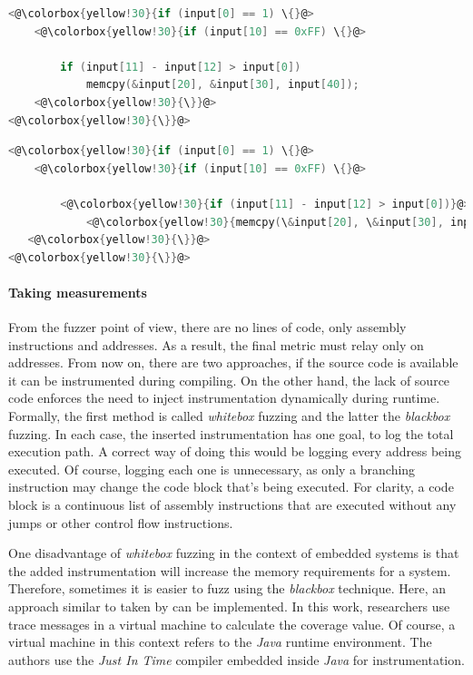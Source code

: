 \begin{minipage}\linewidth
    \begin{lstlisting}[language=C,caption={Code coverage of the first testcase.},label={lst:tc1},captionpos=b]
<@\colorbox{yellow!30}{if (input[0] == 1) \{}@>
    <@\colorbox{yellow!30}{if (input[10] == 0xFF) \{}@>

        if (input[11] - input[12] > input[0])
            memcpy(&input[20], &input[30], input[40]);
    <@\colorbox{yellow!30}{\}}@>
<@\colorbox{yellow!30}{\}}@>
    \end{lstlisting}
\end{minipage}

\begin{minipage}\linewidth
    \begin{lstlisting}[language=C,caption={Code coverage of second testcase.},label={lst:tc2},captionpos=b]
<@\colorbox{yellow!30}{if (input[0] == 1) \{}@>
    <@\colorbox{yellow!30}{if (input[10] == 0xFF) \{}@>

        <@\colorbox{yellow!30}{if (input[11] - input[12] > input[0])}@>
            <@\colorbox{yellow!30}{memcpy(\&input[20], \&input[30], input[40]);}@>
   <@\colorbox{yellow!30}{\}}@>
<@\colorbox{yellow!30}{\}}@>
    \end{lstlisting}
\end{minipage}

\paragraph{Taking measurements}
From the fuzzer point of view, there are no lines of code, only assembly instructions and addresses. As a result, the final metric must relay only on addresses. From now on, there are two approaches, if the source code is available it can be instrumented during compiling. On the other hand, the lack of source code enforces the need to inject instrumentation dynamically during runtime. Formally, the first method is called \textit{whitebox} fuzzing and the latter the \textit{blackbox} fuzzing. In each case, the inserted instrumentation has one goal, to log the total execution path. A correct way of doing this would be logging every address being executed. Of course, logging each one is unnecessary, as only a branching instruction may change the code block that's being executed. For clarity, a code block is a continuous list of assembly instructions that are executed without any jumps or other control flow instructions. 

One disadvantage of \textit{whitebox} fuzzing in the context of embedded systems is that the added instrumentation will increase the memory requirements for a system. Therefore, sometimes it is easier to fuzz using the \textit{blackbox} technique. Here, an approach similar to taken by \cite{tracecoverage} can be implemented. In this work, researchers use trace messages in a virtual machine to calculate the coverage value. Of course, a virtual machine in this context refers to the \textit{Java} runtime environment. The authors use the \textit{Just In Time} compiler embedded inside \textit{Java} for instrumentation.

